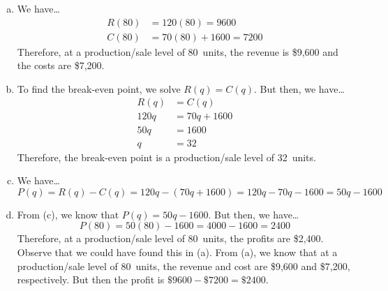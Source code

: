 \documentclass[11pt,letterpaper]{article}
\begin{document}
\sol 
\begin{enumerate}[(a)]
\item We have\dots
	\[
	\begin{aligned}
	R(80)&= 120(80)= 9600 \\
	C(80)&= 70(80) + 1600= 7200
	\end{aligned}
	\] 
Therefore, at a production/sale level of 80~units, the revenue is \$9,600 and the costs are \$7,200. \pspace

\item To find the break-even point, we solve $R(q)= C(q)$. But then, we have\dots
	\[
	\begin{aligned}
	R(q)&= C(q) \\
	120q&= 70q + 1600 \\
	50q&= 1600 \\
	q&= 32
	\end{aligned}
	\]
Therefore, the break-even point is a production/sale level of 32~units. \pspace

\item We have\dots
	\[
	P(q)= R(q) - C(q)= 120q - (70q + 1600)= 120q - 70q - 1600= 50q - 1600
	\] \pspace

\item From (c), we know that $P(q)= 50q - 1600$. But then, we have\dots
	\[
	P(80)= 50(80) - 1600= 4000 - 1600= 2400
	\]
Therefore, at a production/sale level of 80~units, the profits are \$2,400. Observe that we could have found this in (a). From (a), we know that at a production/sale level of 80~units, the revenue and cost are \$9,600 and \$7,200, respectively. But then the profit is $\$9600 - \$7200= \$2400$. 
\end{enumerate}
\end{document}
